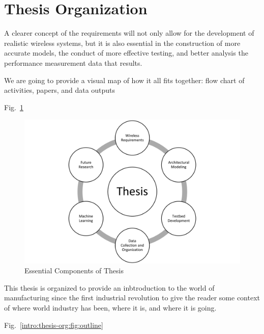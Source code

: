 
\section{Thesis Organization}

A clearer concept of the requirements will not only allow for the development of realistic wireless systems, but it is also essential in the construction of more accurate models, the conduct of more effective testing, and better analysis the performance measurement data that results.

We are going to provide a visual map of how it all fits together: flow chart of activities, papers, and data outputs 

Fig.~\ref{intro:thesis-org:fig:essentials}

\begin{figure}[!tbp]
	\includegraphics[width=1.0\textwidth]{chapter-intro/diagrams/Slide1}
	\caption{Essential Components of Thesis}\label{intro:thesis-org:fig:essentials}
\end{figure}


This thesis is organized to provide an inbtroduction to the world of manufacturing since the first industrial revolution to give the reader some context of where world industry has been, where it is, and where it is going.

Fig.~\ref{intro:thesis-org:fig:outline}

